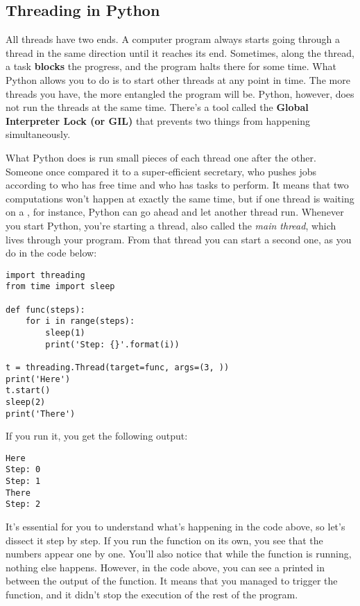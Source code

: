 \subsection{Threading in Python}\label{subsec:multithreading}
All threads have two ends. A computer program always starts going through a thread in the same direction until it reaches its end. Sometimes, along the thread, a task \textbf{blocks} the progress, and the program halts there for some time. What Python allows you to do is to start other threads at any point in time. The more threads you have, the more entangled the program will be. Python, however, does not run the threads at the same time. There's a tool called the \textbf{Global Interpreter Lock (or GIL)} that prevents two things from happening simultaneously.

What Python does is run small pieces of each thread one after the other. Someone once compared it to a super-efficient secretary, who pushes jobs according to who has free time and who has tasks to perform. It means that two computations won't happen at exactly the same time, but if one thread is waiting on a , for instance, Python can go ahead and let another thread run. Whenever you start Python, you're starting a thread, also called the \emph{main thread}, which lives through your program. From that thread you can start a second one, as you do in the code below:

\begin{verbatim}
import threading
from time import sleep

def func(steps):
    for i in range(steps):
        sleep(1)
        print('Step: {}'.format(i))

t = threading.Thread(target=func, args=(3, ))
print('Here')
t.start()
sleep(2)
print('There')
\end{verbatim}

If you run it, you get the following output:

\begin{verbatim}
Here
Step: 0
Step: 1
There
Step: 2
\end{verbatim}

It's essential for you to understand what's happening in the code above, so let's dissect it step by step. If you run the function  on its own, you see that the numbers appear one by one. You'll also notice that while the function is running, nothing else happens. However, in the code above, you can see a  printed in between the output of the function. It means that you managed to trigger the function, and it didn't stop the execution of the rest of the program.

